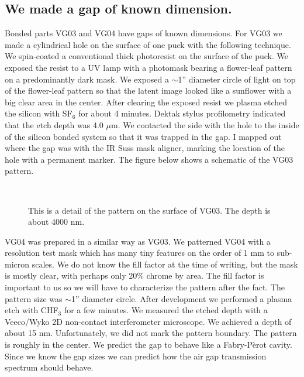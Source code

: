 \subsection{We made a gap of known dimension.}

Bonded parts VG03 and VG04 have gaps of known dimensions.  For VG03 we made a cylindrical hole on the surface of one puck with the following technique.  We spin-coated a conventional thick photoresist on the surface of the puck.  We exposed the resist to a UV lamp with a photomask bearing a flower-leaf pattern on a predominantly dark mask.  We exposed a $\sim$1'' diameter circle of light on top of the flower-leaf pattern so that the latent image looked like a sunflower with a big clear area in the center.  After clearing the exposed resist we plasma etched the silicon with SF$_6$ for about 4 minutes.  Dektak stylus profilometry indicated that the etch depth was 4.0 $\mu$m.  We contacted the side with the hole to the inside of the silicon bonded system so that it was trapped in the gap.  I mapped out where the gap was with the IR Suss mask aligner, marking the location of the hole with a permanent marker.  The figure below shows a schematic of the VG03 pattern.

\begin{figure}[h!] 
\begin{center}
\ 
\caption[VG03 Pattern]{This is a detail of the pattern on the surface of VG03.  The depth is about 4000 nm.}
\label{fig:VG03pattern}
\end{center}
\end{figure}


VG04 was prepared in a similar way as VG03.  We patterned VG04 with a resolution test mask which has many tiny features on the order of 1 mm to sub-micron scales.  We do not know the fill factor at the time of writing, but the mask is mostly clear, with perhaps only 20\% chrome by area.  The fill factor is important to us so we will have to characterize the pattern after the fact.  The pattern size was $\sim$1'' diameter circle. After development we performed a plasma etch with CHF$_3$ for a few minutes.  We measured the etched depth with a Veeco/Wyko 2D non-contact interferometer microscope.  We achieved a depth of about 15 nm.  Unfortunately, we did not mark the pattern boundary.  The pattern is roughly in the center.  We predict the gap to behave like a Fabry-P\`erot cavity.  Since we know the gap sizes we can predict how the air gap transmission spectrum should behave. 

